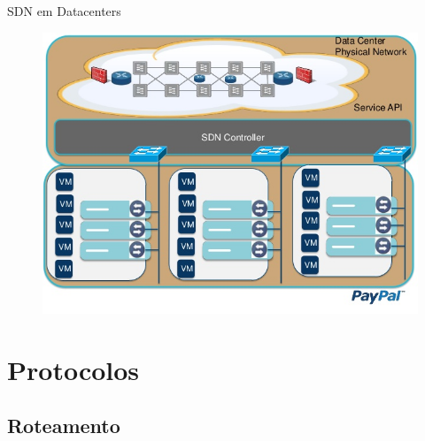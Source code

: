 \documentclass[aspectratio=169]{beamer}
\begin{document}
		\begin{frame} {SDN em Datacenters}
			\begin{figure}[ht]   
				\includegraphics[scale=0.4]{imagens/sdn-3.jpg}
				\label{fig:sample_figure}
			\end{figure}
		\end{frame}


\section{Protocolos}
    \subsection{Roteamento}
    
\end{document}
